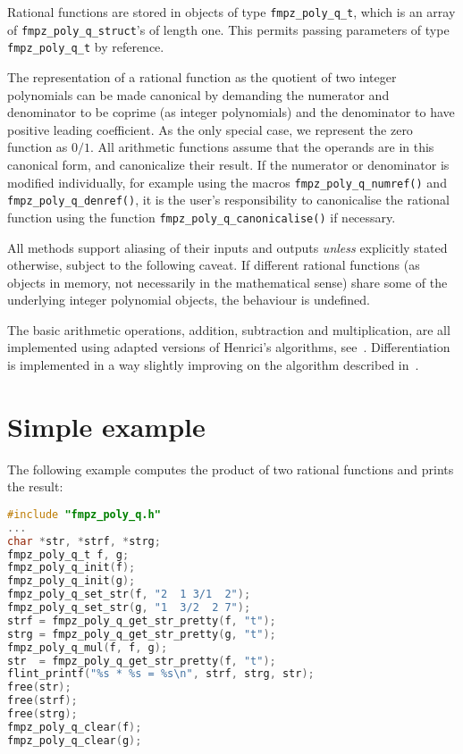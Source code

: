 \documentclass[a4paper,10pt]{book}
\newcommand{\code}{\lstinline}
\begin{document}
{{Rational functions are stored in objects of type \code{fmpz_poly_q_t},
which is an array of \code{fmpz_poly_q_struct}'s of length one.  This
permits passing parameters of type \code{fmpz_poly_q_t} by reference.

The representation of a rational function as the quotient of two integer
polynomials can be made canonical by demanding the numerator and
denominator to be coprime (as integer polynomials) and the denominator to
have positive leading coefficient.  As the only special case, we represent
the zero function as $0/1$.  All arithmetic functions assume that the
operands are in this canonical form, and canonicalize their result.  If the
numerator or denominator is modified individually, for example using the
macros \code{fmpz_poly_q_numref()} and \code{fmpz_poly_q_denref()},
it is the user's responsibility to canonicalise the rational function
using the function \code{fmpz_poly_q_canonicalise()} if necessary.

All methods support aliasing of their inputs and outputs \emph{unless}
explicitly stated otherwise, subject to the following caveat.  If
different rational functions (as objects in memory, not necessarily in the
mathematical sense) share some of the underlying integer polynomial
objects, the behaviour is undefined.

The basic arithmetic operations, addition, subtraction and multiplication,
are all implemented using adapted versions of Henrici's algorithms,
see~\citep{Hen1956}.  Differentiation is implemented in a way slightly
improving on the algorithm described in~\citep{Hor1972}.

\section{Simple example}


The following example computes the product of two rational functions and
prints the result:
\begin{lstlisting}[language=c]
#include "fmpz_poly_q.h"
...
char *str, *strf, *strg;
fmpz_poly_q_t f, g;
fmpz_poly_q_init(f);
fmpz_poly_q_init(g);
fmpz_poly_q_set_str(f, "2  1 3/1  2");
fmpz_poly_q_set_str(g, "1  3/2  2 7");
strf = fmpz_poly_q_get_str_pretty(f, "t");
strg = fmpz_poly_q_get_str_pretty(g, "t");
fmpz_poly_q_mul(f, f, g);
str  = fmpz_poly_q_get_str_pretty(f, "t");
flint_printf("%s * %s = %s\n", strf, strg, str);
free(str);
free(strf);
free(strg);
fmpz_poly_q_clear(f);
fmpz_poly_q_clear(g);
\end{lstlisting}

}}
\end{document}
